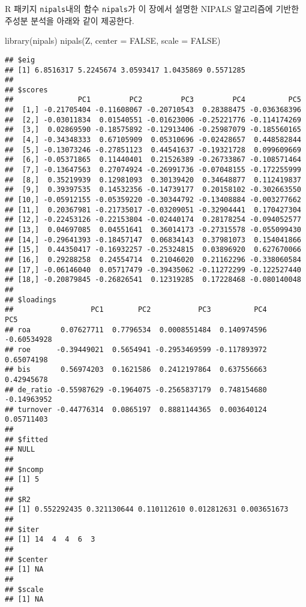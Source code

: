 \documentclass[
]{book}
\newenvironment{Shaded}{\begin{snugshade}}{\end{snugshade}}
\newcommand{\AttributeTok}[1]{\textcolor[rgb]{0.77,0.63,0.00}{#1}}
\newcommand{\ConstantTok}[1]{\textcolor[rgb]{0.00,0.00,0.00}{#1}}
\newcommand{\FunctionTok}[1]{\textcolor[rgb]{0.00,0.00,0.00}{#1}}
\newcommand{\NormalTok}[1]{#1}
\begin{document}
R 패키지 \texttt{nipals}내의 함수 \texttt{nipals}가 이 장에서 설명한 NIPALS 알고리즘에 기반한 주성분 분석을 아래와 같이 제공한다.

\begin{Shaded}
\begin{Highlighting}[]
\FunctionTok{library}\NormalTok{(nipals)}
\FunctionTok{nipals}\NormalTok{(Z, }\AttributeTok{center =} \ConstantTok{FALSE}\NormalTok{, }\AttributeTok{scale =} \ConstantTok{FALSE}\NormalTok{)}
\end{Highlighting}
\end{Shaded}

\begin{verbatim}
## $eig
## [1] 6.8516317 5.2245674 3.0593417 1.0435869 0.5571285
## 
## $scores
##               PC1         PC2         PC3         PC4          PC5
##  [1,] -0.21705404 -0.11608067 -0.20710543  0.28388475 -0.036368396
##  [2,] -0.03011834  0.01540551 -0.01623006 -0.25221776 -0.114174269
##  [3,]  0.02869590 -0.18575892 -0.12913406 -0.25987079 -0.185560165
##  [4,] -0.34348333  0.67105909  0.05310696 -0.02428657  0.448582844
##  [5,] -0.13073246 -0.27851123  0.44541637 -0.19321728  0.099609669
##  [6,] -0.05371865  0.11440401  0.21526389 -0.26733867 -0.108571464
##  [7,] -0.13647563  0.27074924 -0.26991736 -0.07048155 -0.172255999
##  [8,]  0.35219939  0.12981093  0.30139420  0.34648877  0.112419837
##  [9,]  0.39397535  0.14532356 -0.14739177  0.20158102 -0.302663550
## [10,] -0.05912155 -0.05359220 -0.30344792 -0.13408884 -0.003277662
## [11,]  0.20367981 -0.21735017 -0.03209051 -0.32904441  0.170427304
## [12,] -0.22453126 -0.22153804 -0.02440174  0.28178254 -0.094052577
## [13,]  0.04697085  0.04551641  0.36014173 -0.27315578 -0.055099430
## [14,] -0.29641393 -0.18457147  0.06834143  0.37981073  0.154041866
## [15,]  0.44350417 -0.16932257 -0.25324815  0.03896920  0.627670066
## [16,]  0.29288258  0.24554714  0.21046020  0.21162296 -0.338060584
## [17,] -0.06146040  0.05717479 -0.39435062 -0.11272299 -0.122527440
## [18,] -0.20879845 -0.26826541  0.12319285  0.17228468 -0.080140048
## 
## $loadings
##                  PC1        PC2           PC3          PC4         PC5
## roa       0.07627711  0.7796534  0.0008551484  0.140974596 -0.60534928
## roe      -0.39449021  0.5654941 -0.2953469599 -0.117893972  0.65074198
## bis       0.56974203  0.1621586  0.2412197864  0.637556663  0.42945678
## de_ratio -0.55987629 -0.1964075 -0.2565837179  0.748154680 -0.14963952
## turnover -0.44776314  0.0865197  0.8881144365  0.003640124  0.05711403
## 
## $fitted
## NULL
## 
## $ncomp
## [1] 5
## 
## $R2
## [1] 0.552292435 0.321130644 0.110112610 0.012812631 0.003651673
## 
## $iter
## [1] 14  4  4  6  3
## 
## $center
## [1] NA
## 
## $scale
## [1] NA
\end{verbatim}
\end{document}
